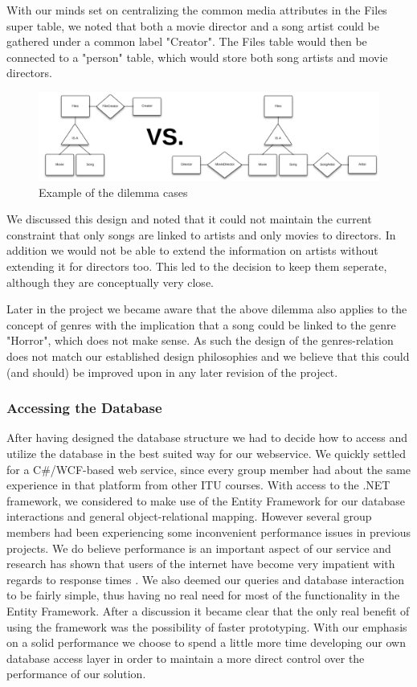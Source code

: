 With our minds set on centralizing the common media attributes in the Files super table, we noted that both a movie director and a song artist could be gathered under a common label "Creator". The Files table would then be connected to a "person" table, which would store both song artists and movie directors.
\begin{figure}[h]
	\centering
	\centerline{\includegraphics[scale=0.52]{./p1design/dilemma.png}}
	\caption{Example of the dilemma cases}
	\label{fig:erddilemma}
\end{figure}

We discussed this design and noted that it could not maintain the current constraint that only songs are linked to artists and only movies to directors. In addition we would not be able to extend the information on artists without extending it for directors too. This led to the decision to keep them seperate, although they are conceptually very close.

Later in the project we became aware that the above dilemma also applies to the concept of genres with the implication that a song could be linked to the genre "Horror", which does not make sense. As such the design of the genres-relation does not match our established design philosophies and we believe that this could (and should) be improved upon in any later revision of the project.

\subsubsection{Accessing the Database}
\label{sec:databaseaccess}
After having designed the database structure we had to decide how to access and utilize the database in the best suited way for our webservice. We quickly settled for a C\#/WCF-based web service, since every group member had about the same experience in that platform from other ITU courses.
With access to the .NET framework, we considered to make use of the Entity Framework for our database interactions and general object-relational mapping. However several group members had been experiencing some inconvenient performance issues in previous projects. We do believe performance is an important aspect of our service and research has shown that users of the internet have become very impatient with regards to response times \cite{webusersflee}. We also deemed our queries and database interaction to be fairly simple, thus having no real need for most of the functionality in the Entity Framework. After a discussion it became clear that the only real benefit of using the framework was the possibility of faster prototyping. With our emphasis on a solid performance we choose to spend a little more time developing our own database access layer in order to maintain a more direct control over the performance of our solution.


